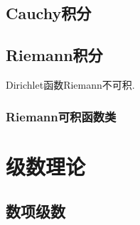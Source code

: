 \subsection{Cauchy积分}

\subsection{Riemann积分}

\begin{definition}[Riemann和]
    
\end{definition}
\begin{definition}[Riemann积分]\label{Riemann积分定义}
    
\end{definition}

\begin{proposition}\label{Dirichlet函数不可积}
    Dirichlet函数Riemann不可积.
\end{proposition}

\subsubsection{Riemann可积函数类}



\begin{proposition}[Riemann可积的充要条件]\label{Riemann可积充要条件}
    
\end{proposition}

\begin{definition}[零测集]
    
\end{definition}
\begin{definition}[Cantor三分集]\label{Cantor三分集}
    
\end{definition}

\begin{theorem}
    
\end{theorem}




\section{级数理论}

\subsection{数项级数}

